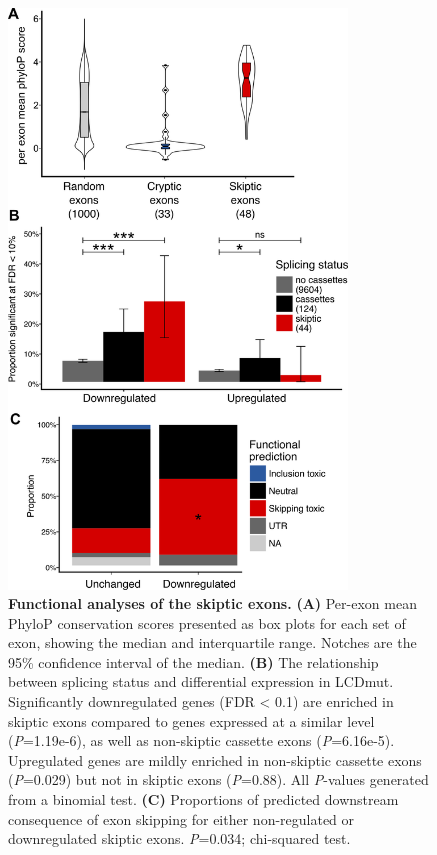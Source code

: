 \begin{figure}[h!]
	\centering
	\includegraphics[width=9cm]{Figures/05_tdp_mice/functional_plots_vertical.png}
	\caption[Functional analyses of the skiptic exons]{
		\textbf{Functional analyses of the skiptic exons.}
	\textbf{(A)} Per-exon mean PhyloP conservation scores presented as box plots for each set of exon, showing the median and interquartile range. Notches are the 95\% confidence interval of the median. 
	\textbf{(B)} The relationship between splicing status and differential expression in LCDmut. Significantly downregulated genes (FDR < 0.1) are enriched in skiptic exons compared to genes expressed at a similar level (\textit{P}=1.19e-6), as well as non-skiptic cassette exons (\textit{P}=6.16e-5). Upregulated genes are mildly enriched in non-skiptic cassette exons (\textit{P}=0.029) but not in skiptic exons (\textit{P}=0.88). All \textit{P}-values generated from a binomial test. 
	\textbf{(C)} Proportions of predicted downstream consequence of exon skipping for either non-regulated or downregulated skiptic exons. \textit{P}=0.034; chi-squared test.
}
	\label{fig:functional_plots}
\end{figure}


